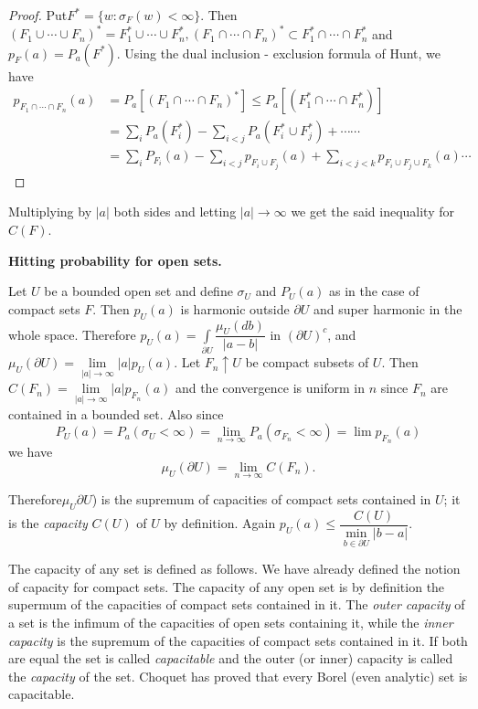 \begin{proof}
  Put\pageoriginale $F^* = \{w : \sigma_F (w) < \infty \}$. Then $(F_1
  \cup \cdots 
  \cup F_n)^* = F^*_1 \cup \cdots \cup F^*_n, (F_1 \cap \cdots \cap
  F_n)^* \subset F^*_1 \cap \cdots \cap F^*_n$ and $p_F (a) = P_a
  (F^*)$. Using the dual inclusion - exclusion formula of Hunt, we
  have 
\begin{align*}
  p_{F_1 \cap \cdots \cap F_n} (a) & = P_a [(F_1 \cap \cdots \cap
    F_n)^*] \leq P_a [(F^*_1 \cap \cdots \cap F^*_n)] \\ 
  & = \sum_i P_a (F^*_i) - \sum_{i < j} P_a (F^*_i \cup F^*_j) + \cdots  \cdots \\
  & =\sum_i P_{F_i} (a) - \sum_{i < j} p_{F_i \cup F_j} (a) + \sum_{i
    < j < k} p_{F_i \cup F_j \cup F_k}(a) \cdots 
\end{align*}
\end{proof}

Multiplying by $|a|$ both sides and letting $|a| \rightarrow \infty$
we get the said inequality for $C(F)$. 

\medskip
\noindent
\textbf{Hitting probability for open sets.}
\smallskip

Let $U$ be a bounded open set and define $\sigma_U$ and $P_U(a)$ as in
the case of compact sets $F$. Then $p_U(a)$ is harmonic outside
$\partial U$ and super harmonic in the whole space. Therefore $p_U(a)
= \int \limits_{\partial U}\dfrac{\mu_U(db)}{|a -b|}$ in $(\partial
U)^c$, and $\mu_U (\partial U) = \lim \limits_{|a| \rightarrow \infty}
|a| p_U(a)$. Let $ F_n \uparrow U$ be compact subsets of $U$. Then
$C(F_n) = \lim \limits_{|a| \rightarrow \infty} |a| p_{F_n} (a)$ and
the convergence is uniform in $n$ since $F_n$ are contained in a
bounded set. Also since 
$$
P_U (a) = P_a (\sigma_U < \infty) = \lim_{n \rightarrow \infty} P_a
  (\sigma_{F_n} < \infty) = \lim p_{F_n}(a)
$$
we have
$$ 	
\mu_U (\partial U) = \lim_{n \rightarrow \infty} C (F_n).
$$

Therefore\pageoriginale $\mu_U \partial U$) is the supremum of
capacities of compact 
sets contained in $U$; it is the \textit{capacity} $C(U)$ of $U$ by
definition. Again $p_U(a) \leq \dfrac{C(U)}{\min \limits_{b \in
    \partial U} |b - a|}$. 

\begin{remark*}
  The capacity of any set is defined as follows. We have already
  defined the notion of capacity for compact sets. The capacity of any
  open set is by definition the supermum of the capacities of compact
  sets contained in it. The \textit{outer capacity} of a set is the
  infimum of the capacities of open sets containing it, while the
  \textit{inner capacity} is the supremum of the capacities of compact
  sets contained in it. If both are equal the set is called
  \textit{capacitable} and the outer (or inner) capacity is called the
  \textit{capacity} of the set. Choquet has proved that every Borel
  (even analytic) set is capacitable. 
\end{remark*}

